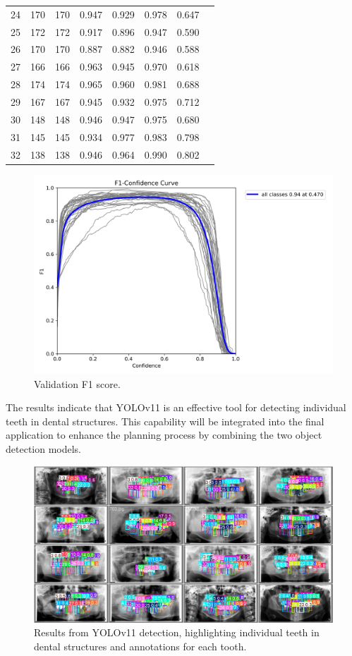 \documentclass[12pt]{article}
\begin{document}
\begin{table}[htpb]
\begin{tabular}{lrrrrrrr}
        24 & 170 & 170 & 0.947 & 0.929 & 0.978 & 0.647 \\
        25 & 172 & 172 & 0.917 & 0.896 & 0.947 & 0.590 \\
        26 & 170 & 170 & 0.887 & 0.882 & 0.946 & 0.588 \\
        27 & 166 & 166 & 0.963 & 0.945 & 0.970 & 0.618 \\
        28 & 174 & 174 & 0.965 & 0.960 & 0.981 & 0.688 \\
        29 & 167 & 167 & 0.945 & 0.932 & 0.975 & 0.712 \\
        30 & 148 & 148 & 0.946 & 0.947 & 0.975 & 0.680 \\
        31 & 145 & 145 & 0.934 & 0.977 & 0.983 & 0.798 \\
        32 & 138 & 138 & 0.946 & 0.964 & 0.990 & 0.802 \\
        \bottomrule
    \end{tabular}
    \label{tab:teeth_detection_metrics_phase2}
\end{table}


\begin{figure}[H]
    \centering
    \includegraphics[width=0.6\linewidth]{F1_curve.png}
    \caption{Validation F1 score.}
    \label{fig:yolo-output}
\end{figure}

\newpage

The results indicate that YOLOv11 is an effective tool for detecting individual teeth in dental structures. This capability will be integrated into the final application to enhance the planning process by combining the two object detection models.

\begin{figure}[H]
    \centering
    \includegraphics[width=0.6\linewidth]{val_batch0_pred.jpg}
    \caption{Results from YOLOv11 detection, highlighting individual teeth in dental structures and annotations for each tooth.}
    \label{fig:yolo-output}
\end{figure}
\end{document}
